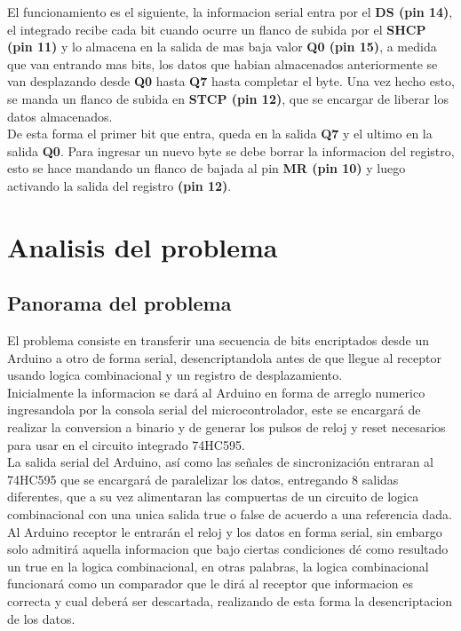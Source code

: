 \documentclass{article}
\begin{document}
El funcionamiento es el siguiente, la informacion serial entra por el \textbf{DS (pin 14)}, el integrado recibe cada bit cuando ocurre un flanco de subida por el \textbf{SHCP (pin 11)} y lo almacena en la salida de mas baja valor \textbf{Q0 (pin 15)}, a medida que van entrando mas bits, los datos que habian almacenados anteriormente se van desplazando desde \textbf{Q0} hasta \textbf{Q7} hasta completar el byte. Una vez hecho esto, se manda un flanco de subida en \textbf{STCP (pin 12)}, que se encargar de liberar los datos almacenados.\\

\noindent De esta forma el primer bit que entra, queda en la salida \textbf{Q7} y el ultimo en la salida \textbf{Q0}.
Para ingresar un nuevo byte se debe borrar la informacion del registro, esto se hace mandando un flanco de bajada al pin \textbf{MR (pin 10)} y luego activando la salida del registro \textbf{(pin 12)}.\cite{74hc595datasheet}

\section{Analisis del problema} \label{analisis}

\subsection{Panorama del problema}


El problema consiste en transferir una secuencia de bits encriptados desde un Arduino a otro de forma serial, desencriptandola antes de que llegue al receptor usando logica combinacional y un registro de desplazamiento.\\

Inicialmente la informacion se dará al Arduino en forma de arreglo numerico ingresandola por la consola serial del microcontrolador, este se encargará de realizar la conversion a binario y de generar los pulsos de reloj y reset necesarios para usar en el circuito integrado 74HC595.\\

La salida serial del Arduino, así como las señales de sincronización entraran al 74HC595 que se encargará de paralelizar los datos, entregando 8 salidas diferentes, que a su vez alimentaran las compuertas de un circuito de logica combinacional con una unica salida true o false de acuerdo a una referencia dada.\\

Al Arduino receptor le entrarán el reloj y los datos en forma serial, sin embargo solo admitirá aquella informacion que bajo ciertas condiciones dé como resultado un true en la logica combinacional, en otras palabras, la logica combinacional funcionará como un comparador que le dirá al receptor que informacion es correcta y cual deberá ser descartada, realizando de esta forma la desencriptacion de los datos.\\
\end{document}
